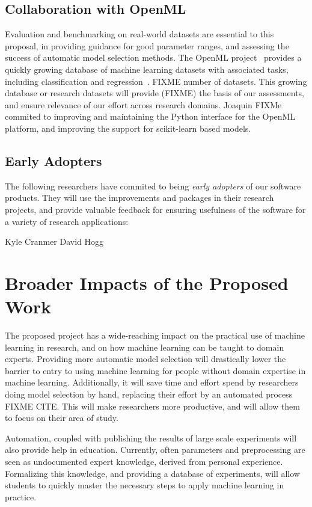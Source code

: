 \subsection{Collaboration with OpenML}
Evaluation and benchmarking on real-world datasets are essential to this proposal, in providing
guidance for good parameter ranges, and assessing the success of automatic model selection methods.
The OpenML project~\cite{van2013openml} provides a quickly growing database of machine learning datasets with associated
tasks, including classification and regression~\cite{vanschoren2014openml}. FIXME number of datasets.
This growing database or research datasets will provide (FIXME) the basis of our assessments, and
ensure relevance of our effort across research domains.
Joaquin FIXMe commited to improving and maintaining the Python interface for the OpenML platform,
and improving the support for scikit-learn based models.

\subsection{Early Adopters}
The following researchers have commited to being \emph{early adopters} of our software
products. They will use the improvements and packages in their research projects,
and provide valuable feedback for ensuring usefulness of the software for a
variety of research applications:

Kyle Cranmer
David Hogg

\section{Broader Impacts of the Proposed Work}
The proposed project has a wide-reaching impact on the practical use of
machine learning in research, and on how machine learning can be taught to
domain experts.
Providing more automatic model selection will drastically lower the barrier
to entry to using machine learning for people without domain expertise
in machine learning.
Additionally, it will save time and effort spend by researchers doing
model selection by hand, replacing their effort by an automated process FIXME CITE\@.
This will make researchers more productive, and will allow them to focus
on their area of study.

Automation, coupled with publishing the results of large scale experiments will
also provide help in education. Currently, often parameters and
preprocessing are seen as undocumented expert knowledge, derived from personal experience.
Formalizing this knowledge, and providing a database of experiments,
will allow students to quickly master the necessary steps to apply
machine learning in practice.

